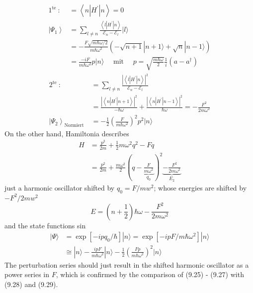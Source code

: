 \begin{equation}
\begin{aligned} 1^{\text {te }}: &=\left\langle n\left|H^{\prime}\right| n\right\rangle= 0 \\\left|\Psi_{1}\right\rangle &=\sum_{l \neq n} \frac{\left\langle l\left|H^{\prime}\right| n\right\rangle}{\mathcal{E}_{n}-\mathcal{E}_{l}}|l\rangle \\ &=-\frac{F \sqrt{m \hbar \omega / 2}}{m \hbar \omega^{2}}(-\sqrt{n+1}|n+1\rangle+\sqrt{n}|n-1\rangle) \\ &=\frac{-i F}{m \hbar \omega^{2}} p|n\rangle \quad \text { mit } \quad p=\sqrt{\frac{m \hbar \omega}{2}} \frac{1}{i}\left(a-a^{\dagger}\right) \end{aligned}
\end{equation}
%
\begin{equation}
\begin{aligned} 2^{\text {te }}: &=\sum_{l \neq n} \frac{\left|\left\langle l\left|H^{\prime}\right| n\right\rangle\right|^{2}}{\mathcal{E}_{n}-\mathcal{E}_{l}} \\ &=\frac{\left|\left\langle n\left|H^{\prime}\right| n+1\right\rangle\right|^{2}}{-\hbar \omega}+\frac{\left|\left\langle n\left|H^{\prime}\right| n-1\right\rangle\right|^{2}}{\hbar \omega}=-\frac{F^{2}}{2 m \omega^{2}} \\\left|\Psi_{2}\right\rangle_{\text {Normiert }} &=-\frac{1}{2}\left(\frac{F}{m \hbar \omega^{2}}\right)^{2} p^{2}|n\rangle \end{aligned}
\end{equation}
On the other hand, Hamiltonia describes
$$
\begin{aligned} H &=\frac{p^{2}}{2 m}+\frac{1}{2} m \omega^{2} q^{2}-F q \\ &=\frac{p^{2}}{2 m}+\frac{m \omega^{2}}{2}(q-\underbrace{\frac{F}{m \omega^{2}}}_{q_{0}})^{2} \underbrace{-\frac{F^{2}}{2 m \omega^{2}}}_{E_{2}} \end{aligned}
$$
just a harmonic oscillator shifted by $q_0 = F / mw^2$; whose energies are shifted by $-F^2 / 2mw^2$
\begin{equation}
    E=\left(n+\frac{1}{2}\right) \hbar \omega-\frac{F^{2}}{2 m \omega^{2}}
    \end{equation}
and the state functions sin
\begin{equation}
\begin{aligned}|\Psi\rangle &=\exp \left[-i p q_{0} / \hbar\right]|n\rangle=\exp \left[-i p F / m \hbar \omega^{2}\right]|n\rangle \\ & \cong|n\rangle-\frac{i p F}{m \hbar \omega^{2}}|n\rangle-\frac{1}{2}\left(\frac{F p}{m \hbar \omega^{2}}\right)^{2}|n\rangle \end{aligned}
\end{equation}
The perturbation series should just result in the shifted harmonic oscillator as a power series in $F$, which is confirmed by the comparison of (9.25) - (9.27) with (9.28) and (9.29).

